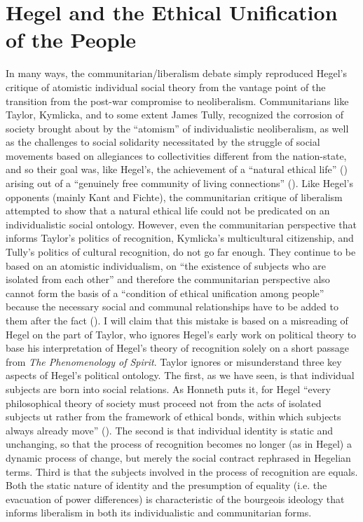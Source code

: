 \documentclass[12pt,oneside]{memoir}
\begin{document}
\section{Hegel and the Ethical Unification of the People}
\label{scrivauto:7}

In many ways, the communitarian/liberalism debate simply reproduced Hegel's critique of atomistic individual social theory from the vantage point of the transition from the post-war compromise to neoliberalism. Communitarians like Taylor, Kymlicka, and to some extent James Tully, recognized the corrosion of society brought about by the ``atomism'' of individualistic neoliberalism, as well as the challenges to social solidarity necessitated by the struggle of social movements based on allegiances to collectivities different from the nation-state, and so their goal was, like Hegel's, the achievement of a ``natural ethical life'' (\citep[102]{Hegel1979}) arising out of a ``genuinely free community of living connections'' (\citep[145]{Hegel1977}). Like Hegel's opponents (mainly Kant and Fichte), the communitarian critique of liberalism attempted to show that a natural ethical life could not be predicated on an individualistic social ontology. However, even the communitarian perspective that informs Taylor's politics of recognition, Kymlicka's multicultural citizenship, and Tully's politics of cultural recognition, do not go far enough. They continue to be based on an atomistic individualism, on ``the existence of subjects who are isolated from each other'' and therefore the communitarian perspective also cannot form the basis of a ``condition of ethical unification among people'' because the necessary social and communal relationships have to be added to them after the fact (\citep[12]{honneth-struggle}).
I will claim that this mistake is based on a misreading of Hegel on the part of Taylor, who ignores Hegel's early work on political theory to base his interpretation of Hegel's theory of recognition solely on a short passage from \textit{The Phenomenology of Spirit}. Taylor ignores or misunderstand three key aspects of Hegel's political ontology. The first, as we have seen, is that individual subjects are born into social relations. As Honneth puts it, for Hegel ``every philosophical theory of society must proceed not from the acts of isolated subjects ut rather from the framework of ethical bonds, within which subjects always already move'' (\citep[14]{honneth-struggle}). The second is that individual identity is static and unchanging, so that the process of recognition becomes no longer (as in Hegel) a dynamic process of change, but merely the social contract rephrased in Hegelian terms. Third is that the subjects involved in the process of recognition are equals. Both the static nature of identity and the presumption of equality (i.e. the evacuation of power differences) is characteristic of the bourgeois ideology that informs liberalism in both its individualistic and communitarian forms.
\end{document}
